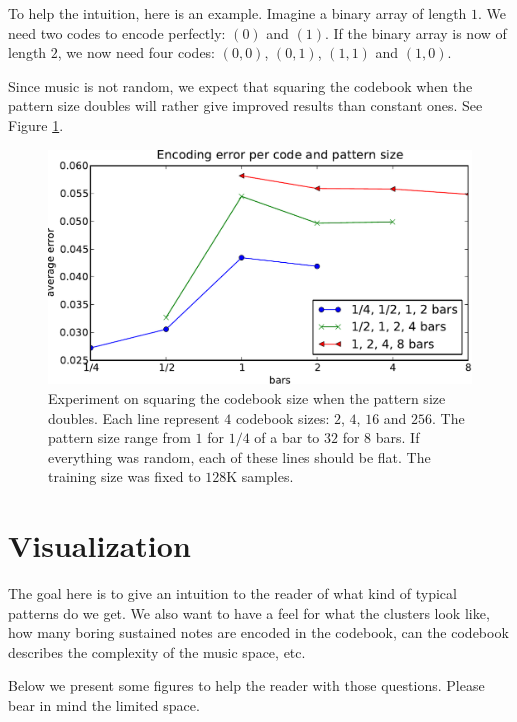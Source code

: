 \documentclass{article}
\begin{document}
To help the intuition, here is an example. Imagine a binary array of 
length $1$. We need two
codes to encode perfectly: $(0)$ and $(1)$. If the binary array is now of
length $2$, we now need four codes: $(0,0)$, $(0,1)$, $(1,1)$ and $(1,0)$.

Since music is not random, we expect that squaring the codebook when the
pattern size doubles will rather give improved results than constant ones.
See Figure \ref{fig:size_pattern}.

\begin{figure}[htb]
\begin{center}
\includegraphics[width=.99\columnwidth]{codesize_patternsize}
\end{center}
\caption{\small{
Experiment on squaring the codebook size when the pattern size doubles.
Each line represent $4$ codebook sizes: $2$, $4$, $16$ and $256$.
The pattern size range from $1$ for $1/4$ of a bar to $32$ for $8$ bars.
If everything was random, each of these lines should be flat. The training
size was fixed to $128$K samples.
}}
\label{fig:size_pattern}
\end{figure}

\section{Visualization} \label{sec:visu}
The goal here is to give an intuition to the reader of what kind of
typical patterns do we get. We also want to have a feel for what the
clusters look like, how many boring sustained notes are encoded in the
codebook, can the codebook describes the complexity of the music space, etc.

Below we present some figures to help the reader with those questions.
Please bear in mind the limited space.
\end{document}
